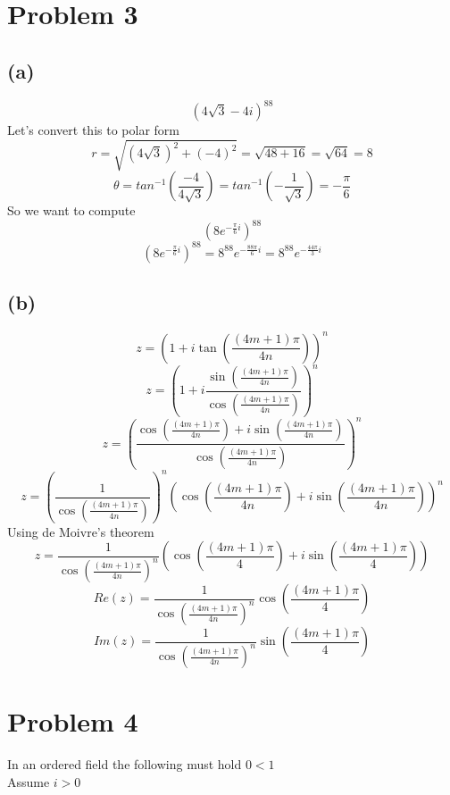 \documentclass{article}
\begin{document}
\section*{Problem 3}
\subsection*{(a)}
\[
   (4\sqrt{3} - 4i)^{88}
\]
Let's convert this to polar form
\[
   r = \sqrt{(4\sqrt{3})^2 + (-4)^2} = \sqrt{48 + 16} = \sqrt{64} = 8
\]
\[
   \theta = tan^{-1}(\frac{-4}{4\sqrt{3}}) = tan^{-1}(-\frac{1}{\sqrt{3}}) = -\frac{\pi}{6}
\]
So we want to compute
\[
   (8e^{-\frac{\pi}{6}i})^{88}
\]
\[
   (8e^{-\frac{\pi}{6}i})^{88} = 8^{88}e^{-\frac{88\pi}{6}i} = 8^{88}e^{-\frac{44\pi}{3}i}
\]

\subsection*{(b)}

\[
   z = \left(1 + i \tan\left(\frac{(4m + 1)\pi}{4n}\right)\right)^n
\]
\[
   z = \left(1 + i \frac{\sin\left(\frac{(4m + 1)\pi}{4n}\right)}{\cos\left(\frac{(4m + 1)\pi}{4n}\right)}\right)^n
\]
\[
   z = \left(\frac{ \cos\left(\frac{(4m + 1)\pi}{4n}\right)  + i\sin\left(\frac{(4m + 1)\pi}{4n}\right)  }{\cos\left(\frac{(4m + 1)\pi}{4n}\right)}\right)^n
\]
\[
   z = \left(\frac{1}{\cos\left(\frac{(4m + 1)\pi}{4n}\right)}\right)^n \left(\cos\left(\frac{(4m + 1)\pi}{4n}\right) + i\sin\left(\frac{(4m + 1)\pi}{4n}\right)\right)^n
\]
Using de Moivre's theorem
\[
   z = \frac{1}{\cos\left(\frac{(4m + 1)\pi}{4n}\right)^n} \left(\cos\left(\frac{(4m + 1)\pi}{4}\right) + i\sin\left(\frac{(4m + 1)\pi}{4}\right)\right)
\]
\[
   Re(z) = \frac{1}{\cos\left(\frac{(4m + 1)\pi}{4n}\right)^n} \cos\left(\frac{(4m + 1)\pi}{4}\right)
\]
\[
   Im(z) = \frac{1}{\cos\left(\frac{(4m + 1)\pi}{4n}\right)^n} \sin\left(\frac{(4m + 1)\pi}{4}\right)
\]

\section*{Problem 4}

In an ordered field the following must hold \(0 < 1\) \\
Assume \(i > 0\)
\end{document}

